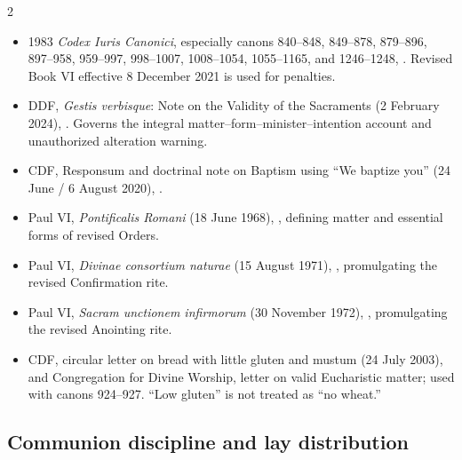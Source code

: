 \begin{multicols}{2}
\begin{itemize}[itemsep=0.12em,topsep=0.15em]
\item 1983 \emph{Codex Iuris Canonici}, especially canons 840--848, 849--878, 879--896, 897--958, 959--997, 998--1007, 1008--1054, 1055--1165, and 1246--1248, . Revised Book VI effective 8 December 2021 is used for penalties.
\item DDF, \emph{Gestis verbisque}: Note on the Validity of the Sacraments (2 February 2024), . Governs the integral matter--form--minister--intention account and unauthorized alteration warning.
\item CDF, Responsum and doctrinal note on Baptism using “We baptize you” (24 June / 6 August 2020), .
\item Paul VI, \emph{Pontificalis Romani} (18 June 1968), , defining matter and essential forms of revised Orders.
\item Paul VI, \emph{Divinae consortium naturae} (15 August 1971), , promulgating the revised Confirmation rite.
\item Paul VI, \emph{Sacram unctionem infirmorum} (30 November 1972), , promulgating the revised Anointing rite.
\item CDF, circular letter on bread with little gluten and mustum (24 July 2003), and Congregation for Divine Worship, letter on valid Eucharistic matter; used with canons 924--927. “Low gluten” is not treated as “no wheat.”
\end{itemize}

\subsection*{Communion discipline and lay distribution}


\end{multicols}
